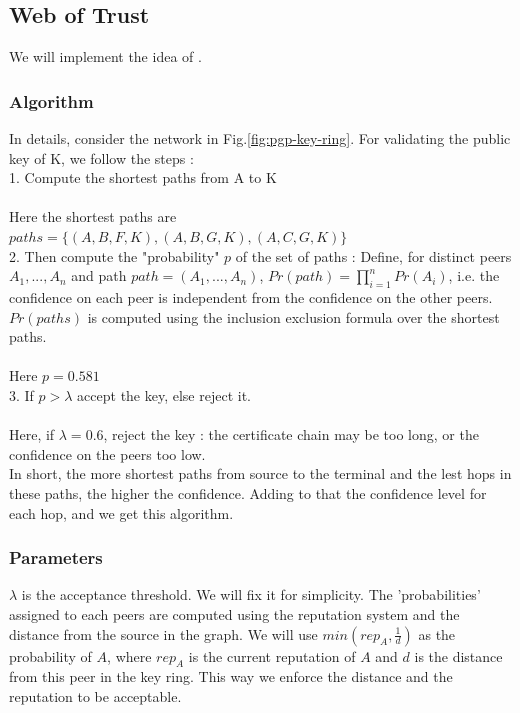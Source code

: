 \documentclass[]{article}
\begin{document}
\subsection{Web of Trust}
\label{sec:web-of-trust-spec}
We will implement the idea of \cite{haenni2007new}.

\subsubsection{Algorithm}
\label{sec:wts-algo}
In details, consider the network in Fig.\ref{fig:pgp-key-ring}. For validating the public key of K, we follow the steps : \\

1. Compute the shortest paths from A to K \\\\
Here the shortest paths are $paths = \{(A,B,F,K), (A,B,G,K), (A,C,G,K)\}$\\

2. Then compute the "probability" $p$ of the set of paths : \newline
Define, for distinct peers $A_1,...,A_n$ and path $path = (A_1,...,A_n)$, $Pr(path) = \prod_{i = 1}^{n} Pr(A_i)$, i.e. the confidence on each peer is independent from the confidence on the other peers. \\
$Pr(paths)$ is computed using the inclusion exclusion formula over the shortest paths. \\\\
Here $p = 0.581$ \\

3. If $p > \lambda$ accept the key, else reject it. \\\\
Here, if $\lambda = 0.6$, reject the key : the certificate chain may be too long, or the confidence on the peers too low.\\


In short, the more shortest paths from source to the terminal and the lest hops in these paths, the higher the confidence. Adding to that the confidence level for each hop, and we get this algorithm.

\subsubsection{Parameters}
\label{sec:parameters}
$\lambda$ is the acceptance threshold. We will fix it for simplicity. \newline
The 'probabilities' assigned to each peers are computed using the reputation system and the distance from the source in the graph. We will use $min(rep_A, \frac{1}{d})$ as the probability of $A$, where $rep_A$ is the current reputation of $A$ and $d$ is the distance from this peer in the key ring. This way we enforce the distance and the reputation to be acceptable.
\end{document}
